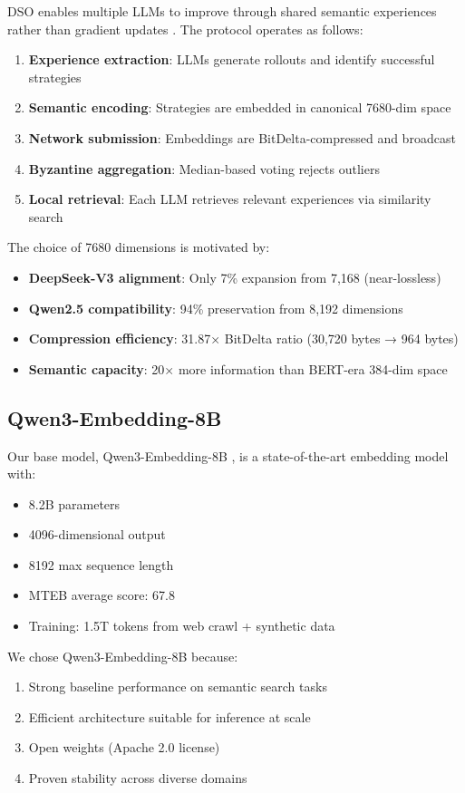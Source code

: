 \documentclass[11pt,letterpaper]{article}
\begin{document}
DSO enables multiple LLMs to improve through shared semantic experiences rather than gradient updates \cite{training_free_grpo2024}. The protocol operates as follows:

\begin{enumerate}
    \item \textbf{Experience extraction}: LLMs generate rollouts and identify successful strategies
    \item \textbf{Semantic encoding}: Strategies are embedded in canonical 7680-dim space
    \item \textbf{Network submission}: Embeddings are BitDelta-compressed and broadcast
    \item \textbf{Byzantine aggregation}: Median-based voting rejects outliers
    \item \textbf{Local retrieval}: Each LLM retrieves relevant experiences via similarity search
\end{enumerate}

The choice of 7680 dimensions is motivated by:
\begin{itemize}
    \item \textbf{DeepSeek-V3 alignment}: Only 7\% expansion from 7,168 (near-lossless)
    \item \textbf{Qwen2.5 compatibility}: 94\% preservation from 8,192 dimensions
    \item \textbf{Compression efficiency}: 31.87× BitDelta ratio (30,720 bytes → 964 bytes)
    \item \textbf{Semantic capacity}: 20× more information than BERT-era 384-dim space
\end{itemize}

\subsection{Qwen3-Embedding-8B}

Our base model, Qwen3-Embedding-8B \cite{qwen2024}, is a state-of-the-art embedding model with:
\begin{itemize}
    \item 8.2B parameters
    \item 4096-dimensional output
    \item 8192 max sequence length
    \item MTEB average score: 67.8
    \item Training: 1.5T tokens from web crawl + synthetic data
\end{itemize}

We chose Qwen3-Embedding-8B because:
\begin{enumerate}
    \item Strong baseline performance on semantic search tasks
    \item Efficient architecture suitable for inference at scale
    \item Open weights (Apache 2.0 license)
    \item Proven stability across diverse domains
\end{enumerate}
\end{document}
